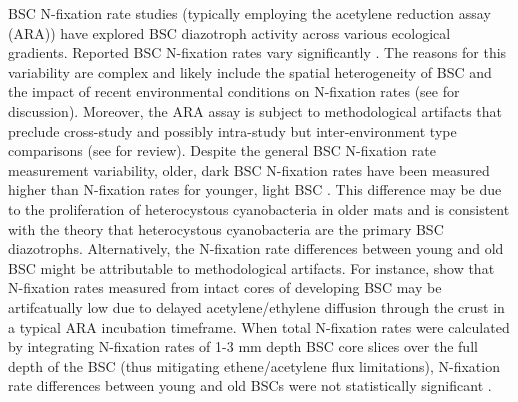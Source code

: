 BSC N-fixation rate studies (typically employing the acetylene reduction assay (ARA)) have explored BSC diazotroph activity across various ecological gradients. Reported BSC N-fixation rates vary significantly \cite{Evans_2001}. The reasons for this variability are complex and likely include the spatial heterogeneity of BSC \cite{Evans_2001} and the impact of recent environmental conditions on N-fixation rates (see \citet{Belnap_2001} for discussion). Moreover, the ARA assay is subject to methodological artifacts that preclude cross-study and possibly intra-study but inter-environment type comparisons (see \citet{Belnap_2001} for review). Despite the general BSC N-fixation rate measurement variability, older, dark BSC N-fixation rates have been measured higher than N-fixation rates for younger, light BSC \cite{Belnap_2002, 14766579}. This difference may be due to the proliferation of heterocystous cyanobacteria in older mats and is consistent with the theory that heterocystous cyanobacteria are the primary BSC diazotrophs. Alternatively, the N-fixation rate differences between young and old BSC might be attributable to methodological artifacts. For instance, \citet{15643930} show that N-fixation rates measured from intact cores of developing BSC may be artifcatually low due to delayed acetylene/ethylene diffusion through the crust in a typical ARA incubation timeframe. When total N-fixation rates were calculated by integrating N-fixation rates of 1-3 mm depth BSC core slices over the full depth of the BSC (thus mitigating ethene/acetylene flux limitations), N-fixation rate differences between young and old BSCs were not statistically significant \cite{15643930}.

